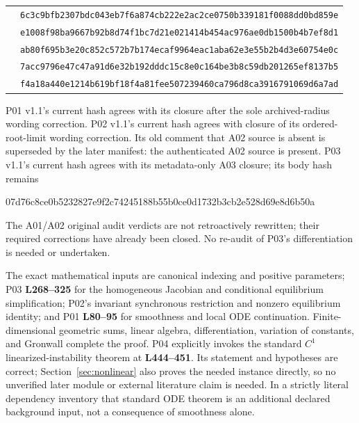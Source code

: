 \documentclass[11pt]{article}
\newcommand{\lin}[1]{\textbf{L#1}}
\newcommand{\sha}[2]{\par{\small\ttfamily #1\allowbreak #2}\par}
\begin{document}
\begin{longtable}{L{0.44\textwidth}L{0.50\textwidth}}
\small{} & \small\texttt{6c3c9bfb2307bdc043eb7f6a874cb222}\newline\texttt{e2ac2ce0750b339181f0088dd0bd859e}\\
\small{} & \small\texttt{e1008f98ba9667b92b8d74f1bc7d21e0}\newline\texttt{21414b454ac976ae0db1500b4b7ef8d1}\\
\small{} & \small\texttt{ab80f695b3e20c852c572b7b174ecaf9}\newline\texttt{964eac1aba62e3e55b2b4d3e60754e0c}\\
\small{} & \small\texttt{7acc9796e47c47a91d6e32b192dddc15}\newline\texttt{c8e0c164be3b8c59db201265ef8137b5}\\
\small{} & \small\texttt{f4a18a440e1214b619bf18f4a81fee50}\newline\texttt{7239460ca796d8ca3916791069d6a7ad}\\
\bottomrule
\end{longtable}

P01 v1.1's current hash agrees with its closure after the sole archived-radius
wording correction. P02 v1.1's current hash agrees with closure of its
ordered-root-limit wording correction. Its old comment that A02 source is
absent is superseded by the later manifest: the authenticated A02 source is
present. P03 v1.1's current hash agrees with its metadata-only A03 closure;
its body hash remains
\sha{07d76c8ce0b5232827e9f2c74245188b5}{5b0ce0d1732b3cb2e528d69e8d6b50a}
The A01/A02 original audit verdicts are not retroactively rewritten; their
required corrections have already been closed. No re-audit of P03's
differentiation is needed or undertaken.

The exact mathematical inputs are canonical indexing and positive parameters;
P03 \lin{268--325} for the homogeneous Jacobian and conditional equilibrium
simplification; P02's invariant synchronous restriction and nonzero equilibrium
identity; and P01 \lin{80--95} for smoothness and local ODE continuation.
Finite-dimensional geometric sums, linear algebra, differentiation,
variation of constants, and Gronwall complete the proof. P04 explicitly
invokes the standard $C^1$ linearized-instability theorem at \lin{444--451}.
Its statement and hypotheses are correct; Section~\ref{sec:nonlinear}
also proves the needed instance directly, so no unverified later module
or external literature claim is needed. In a strictly literal dependency
inventory that standard ODE theorem is an additional declared background
input, not a consequence of smoothness alone.
\end{document}
